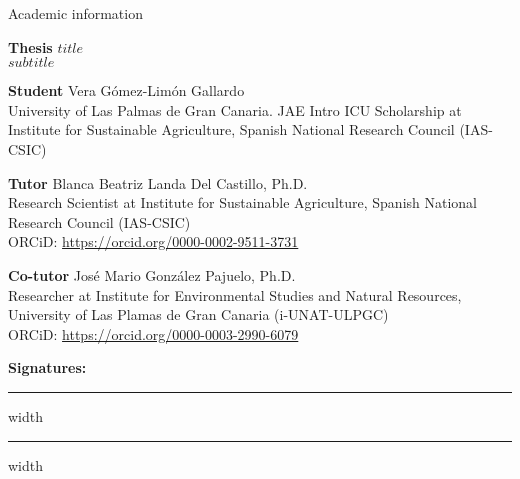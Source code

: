 \begin{flushleft}
  \Large
    Academic information
        
  \vspace{0.5cm}
  \normalsize
  \textbf{Thesis}
    $title$\\
    $subtitle$
  
  \vspace{0.5cm}
  \textbf{Student}
    Vera Gómez-Limón Gallardo\\
    University of Las Palmas de Gran Canaria. JAE Intro ICU Scholarship at Institute for Sustainable Agriculture, Spanish National Research Council (IAS-CSIC)
  
  \vspace{0.5cm}
  \textbf{Tutor}
    Blanca Beatriz Landa Del Castillo, Ph.D.\\
    Research Scientist at Institute for Sustainable Agriculture, Spanish National Research Council (IAS-CSIC)\\
    ORCiD: \url{https://orcid.org/0000-0002-9511-3731}
  
  \vspace{0.5cm}
  \textbf{Co-tutor}
    José Mario González Pajuelo, Ph.D.\\
    Researcher at Institute for Environmental Studies and Natural Resources, University of Las Plamas de Gran Canaria (i-UNAT-ULPGC)\\
    ORCiD: \url{https://orcid.org/0000-0003-2990-6079}
  
  \vspace{1.0cm}
  \centerline{\textbf{Signatures:}}
  
  \vspace{0.5cm}
  \hrule height 0.4pt width \textwidth
  \vfill
  \hrule height 0.4pt width \textwidth
\end{flushleft}